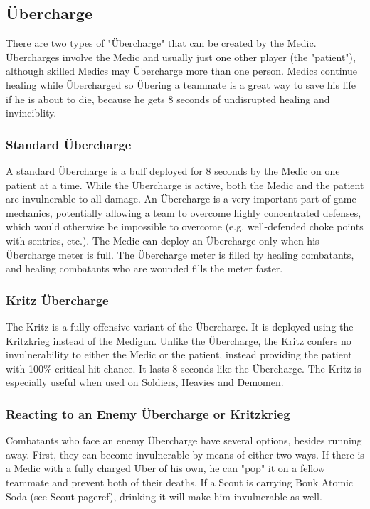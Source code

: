 \subsection{Übercharge}
There are two types of "Übercharge" that can be created by the Medic. Übercharges involve the Medic and usually just one other player (the "patient"), although skilled Medics may Übercharge more than one person.  Medics continue healing while Übercharged so Übering a teammate is a great way to save his life if he is about to die, because he gets 8 seconds of undisrupted healing and invinciblity.

\subsubsection{Standard Übercharge}
A standard Übercharge is a buff deployed for 8 seconds by the Medic on one patient at a time. While the Übercharge is active, both the Medic and the patient are invulnerable to all damage. An Übercharge is a very important part of game mechanics, potentially allowing a team to overcome highly concentrated defenses, which would otherwise be impossible to overcome (e.g. well-defended choke points with sentries, etc.). The Medic can deploy an Übercharge only when his Übercharge meter is full. The Übercharge meter is filled by healing combatants, and healing combatants who are wounded fills the meter faster.

\subsubsection{Kritz Übercharge}
The Kritz is a fully-offensive variant of the Übercharge. It is deployed using the Kritzkrieg instead of the Medigun. Unlike the Übercharge, the Kritz confers no invulnerability to either the Medic or the patient, instead providing the patient with 100\% critical hit chance. It lasts 8 seconds like the Übercharge. The Kritz is especially useful when used on Soldiers, Heavies and Demomen.  

\subsubsection{Reacting to an Enemy Übercharge or Kritzkrieg}
Combatants who face an enemy Übercharge have several options, besides running away. First, they can become invulnerable by means of either two ways. If there is a Medic with a fully charged Über of his own, he can "pop" it on a fellow teammate and prevent both of their deaths. If a Scout is carrying Bonk Atomic Soda (see Scout {{pageref}}), drinking it will make him invulnerable as well.

